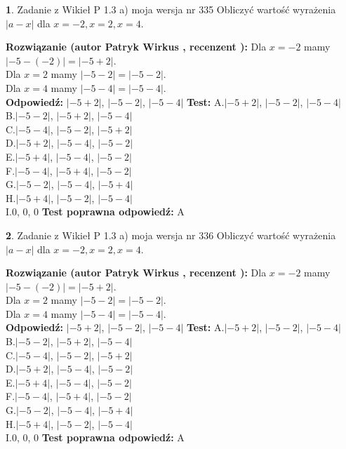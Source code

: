 \documentclass[12pt, a4paper]{article}
\theoremstyle{definition} %
\newtheorem{zad}{}
\newcommand{\zadStart}[1]{\begin{zad}#1\newline}
\newcommand{\zadStop}{\end{zad}}
\newcommand{\rozwStart}[2]{\noindent \textbf{Rozwiązanie (autor #1 , recenzent #2): }\newline}
\newcommand{\rozwStop}{\newline}
\newcommand{\odpStart}{\noindent \textbf{Odpowiedź:}\newline}
\newcommand{\odpStop}{\newline}
\newcommand{\testStart}{\noindent \textbf{Test:}\newline}
\newcommand{\testStop}{\newline}
\newcommand{\kluczStart}{\noindent \textbf{Test poprawna odpowiedź:}\newline}
\newcommand{\kluczStop}{\newline}
\begin{document}
\zadStart{Zadanie z Wikieł P 1.3 a) moja wersja nr 335}
Obliczyć wartość wyrażenia $|a - x|$ dla $x=-2,x=2,x=4$.
\zadStop
\rozwStart{Patryk Wirkus}{}
Dla $x = -2$ mamy $|-5 - (-2)| = |-5 + 2|$.\\
Dla $x = 2$ mamy $|-5 - 2| = |-5 - 2|$.\\
Dla $x = 4$ mamy $|-5 - 4| = |-5 - 4|$.\\
\rozwStop
\odpStart
$|-5 + 2|$, $|-5 - 2|$, $|-5 - 4|$
\odpStop
\testStart
A.$|-5 + 2|$, $|-5 - 2|$, $|-5 - 4|$\\
B.$|-5 - 2|$, $|-5 + 2|$, $|-5 - 4|$\\
C.$|-5 - 4|$, $|-5 - 2|$, $|-5 + 2|$\\
D.$|-5 + 2|$, $|-5 - 4|$, $|-5 - 2|$\\
E.$|-5 + 4|$, $|-5 - 4|$, $|-5 - 2|$\\
F.$|-5 - 4|$, $|-5 + 4|$, $|-5 - 2|$\\
G.$|-5 - 2|$, $|-5 - 4|$, $|-5 + 4|$\\
H.$|-5 + 4|$, $|-5 - 2|$, $|-5 - 4|$\\
I.$0$, $0$, $0$
\testStop
\kluczStart
A
\kluczStop



\zadStart{Zadanie z Wikieł P 1.3 a) moja wersja nr 336}
Obliczyć wartość wyrażenia $|a - x|$ dla $x=-2,x=2,x=4$.
\zadStop
\rozwStart{Patryk Wirkus}{}
Dla $x = -2$ mamy $|-5 - (-2)| = |-5 + 2|$.\\
Dla $x = 2$ mamy $|-5 - 2| = |-5 - 2|$.\\
Dla $x = 4$ mamy $|-5 - 4| = |-5 - 4|$.\\
\rozwStop
\odpStart
$|-5 + 2|$, $|-5 - 2|$, $|-5 - 4|$
\odpStop
\testStart
A.$|-5 + 2|$, $|-5 - 2|$, $|-5 - 4|$\\
B.$|-5 - 2|$, $|-5 + 2|$, $|-5 - 4|$\\
C.$|-5 - 4|$, $|-5 - 2|$, $|-5 + 2|$\\
D.$|-5 + 2|$, $|-5 - 4|$, $|-5 - 2|$\\
E.$|-5 + 4|$, $|-5 - 4|$, $|-5 - 2|$\\
F.$|-5 - 4|$, $|-5 + 4|$, $|-5 - 2|$\\
G.$|-5 - 2|$, $|-5 - 4|$, $|-5 + 4|$\\
H.$|-5 + 4|$, $|-5 - 2|$, $|-5 - 4|$\\
I.$0$, $0$, $0$
\testStop
\kluczStart
A
\kluczStop
\end{document}

